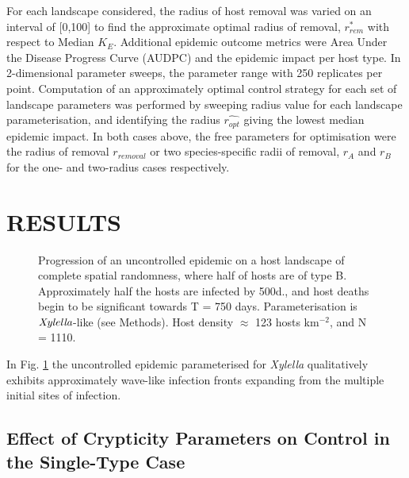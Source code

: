 \documentclass[prstpaper]{revtex4-2}
\begin{document}
For each landscape considered, the radius of host removal was varied on an interval of [0,100] to find the approximate optimal radius of removal, $r_{rem}^{*}$ with respect to Median ${K_{E}}$. Additional epidemic outcome metrics were Area Under the Disease Progress Curve (AUDPC) \cite{Cunniffe2015} and the epidemic impact per host type.
In 2-dimensional parameter sweeps, the parameter range with 250 replicates per point. Computation of an approximately optimal control strategy for each set of landscape parameters was performed  by sweeping radius value for each landscape parameterisation, and identifying the radius $\hat{r_{opt}}$ giving the lowest median epidemic impact.
In both cases above, the free parameters for optimisation were the radius of removal $r_{removal}$ or two species-specific radii of removal, $r_{A}$ and $r_{B}$ for the one- and two-radius cases respectively. 



\section*{RESULTS}




%
%


\begin{figure}[hbt!]

%
\caption{ \label{epi_nocontrol} Progression of an uncontrolled epidemic on a host landscape of complete spatial randomness, where half of hosts are of type B. Approximately half the hosts are infected by 500d., and host deaths begin to be significant towards T = 750 days. Parameterisation is $\emph{Xylella}$-like (see Methods). Host density $\approx$ 123 hosts km$^{-2}$, and N = 1110. }
\end{figure}


In Fig. \ref{epi_nocontrol} the uncontrolled epidemic parameterised for \emph{Xylella} qualitatively exhibits approximately wave-like infection fronts expanding from the multiple initial sites of infection.

\subsection*{Effect of Crypticity Parameters on Control in the Single-Type Case}
\end{document}

